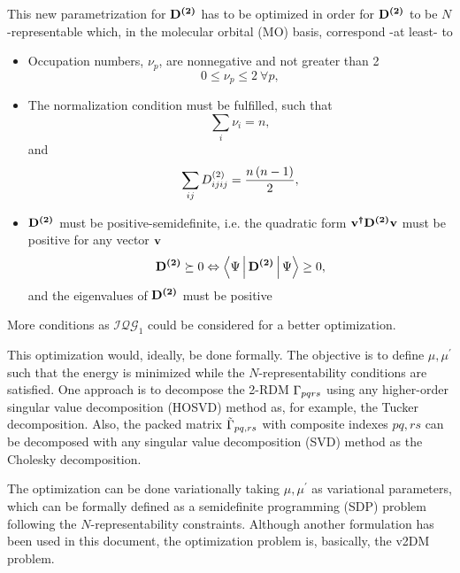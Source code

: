 This new parametrization for $\boldsymbol{\mathrm{D^{\left( 2 \right)}}}$ has to be optimized in order for
$\boldsymbol{\mathrm{D^{\left( 2 \right)}}}$ to be $N$-representable which, in the molecular
orbital (MO) basis, correspond -at least- to
\begin{itemize}
    \item Occupation numbers, $\nu_p$, are nonnegative and not greater than 2 
        \begin{equation}
            0 \le \nu_p \le 2\ \forall p,
        \end{equation}

    \item The normalization condition must be fulfilled, such that 
        \begin{equation} \label{eq:MO-norm-cond-1}
            \sum_{i} \nu_i = n,
        \end{equation}
        and 
        \begin{equation} \label{ec:normalization-condition-2RDM}
            \sum_{ij} D^{\left( 2 \right)}_{ijij} = \frac{n\left( n-1 \right)}{2}, 
        \end{equation}

    \item $\boldsymbol{\mathrm{D^{\left( 2 \right)}}}$ must be positive-semidefinite, i.e. the quadratic form
        $\boldsymbol{\mathrm{v^{\dagger} D^{\left( 2 \right)} v}}$ must be positive for any vector $\boldsymbol{\mathrm{v}}$
        \begin{equation}
            \mat{\tedm} \succeq 0 \Leftrightarrow \Braket{\Psi | \mat{\tedm} | \Psi} \ge 0,
        \end{equation}
        and the eigenvalues of $\boldsymbol{\mathrm{D^{\left( 2 \right)}}}$ must be positive

\end{itemize}
More conditions as $\mathcal{I} \mathcal{Q} \mathcal{G}_1$ could be
considered for a better optimization.

This optimization would, ideally, be done formally.
The objective is to define $\mu, \mu^{\prime}$ such that the energy is minimized
while the $N$-representability conditions are satisfied.
One approach is to decompose the 2-RDM $\Gamma_{pqrs}$ using any higher-order
singular value decomposition (HOSVD) method as, for example,
the Tucker decomposition.
Also, the packed matrix $\tilde{\Gamma}_{pq,rs}$ with composite indexes $pq, rs$
can be decomposed with any singular value decomposition (SVD) method as the Cholesky
decomposition.

The optimization can be done variationally taking $\mu,\mu^{\prime}$ as variational
parameters, which can be formally defined as a semidefinite
programming (SDP) problem following the $N$-representability 
constraints.
Although another formulation has been used in this document, the optimization
problem is, basically, the v2DM problem.

